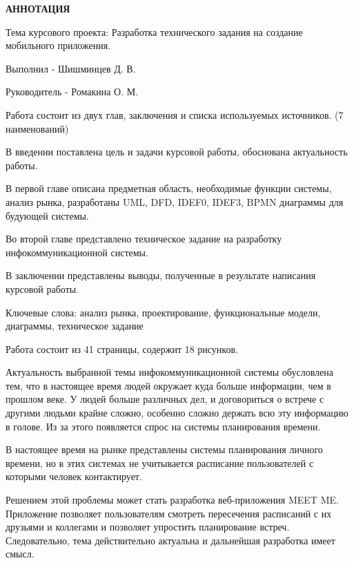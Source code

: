 \documentclass[14pt]{extreport}
\begin{document}
\pagestyle{empty} %


\pagestyle{plain} %
\newpage
\begin{center}
\begin{normalsize}
\textbf{АННОТАЦИЯ}
\end{normalsize}
\end{center}

Тема курсового проекта: Разработка технического задания на создание мобильного приложения.

Выполнил - Шишминцев Д. В.

Руководитель - Ромакина О. М. 

Работа состоит из двух глав, заключения и списка используемых источников. (7 наименований)

В введении поставлена цель и задачи курсовой работы, обоснована актуальность работы. 

В первой главе описана предметная область, необходимые функции системы, анализ рынка, разработаны UML, DFD, IDEF0, IDEF3, BPMN диаграммы для будующей системы. 

Во второй главе представлено техническое задание на разработку инфокоммуникационной системы. 

В заключении представлены выводы, полученные в результате написания курсовой работы. 

Ключевые слова: анализ рынка, проектирование, функциональные модели, диаграммы, техническое задание

Работа состоит из 41 страницы, содержит 18 рисунков. 
\newpage

\tableofcontents
\intro\label{intro} 

Актуальность выбранной темы инфокоммуникационной системы обусловлена тем, что в настоящее время людей окружает куда больше информации, чем в прошлом веке. У людей больше различных дел, и договориться о встрече с другими людьми крайне сложно, особенно сложно держать всю эту информацию в голове. Из за этого появляется спрос на системы планирования времени. 

В настоящее время на рынке представлены системы планирования личного времени, но в этих системах не учитывается расписание пользователей с которыми человек контактирует.

Решением этой проблемы может стать разработка веб-приложения MEET ME. Приложение позволяет пользователям смотреть пересечения расписаний с их друзьями и коллегами и позволяет упростить планирование встреч. Следовательно, тема действительно актуальна и дальнейшая разработка имеет смысл.
\end{document}
